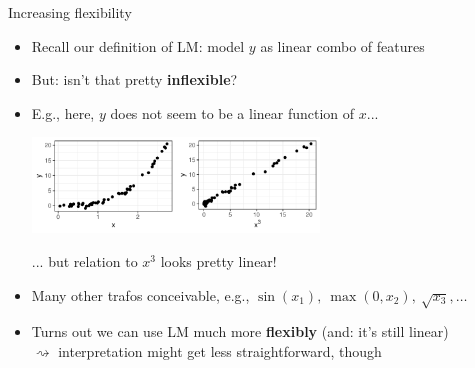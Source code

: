 \documentclass[11pt,compress,t,notes=noshow, xcolor=table]{beamer}
\begin{document}
\begin{vbframe}{Increasing flexibility}

\begin{itemize}
    \item Recall our definition of LM: model $y$ as linear combo of features
    \item But: isn't that pretty \textbf{inflexible}?
    \item E.g., here, $y$ does not seem to be a linear function of $x$...

    \vspace{0.5cm}
    \begin{center}
        \includegraphics[width=0.6\textwidth]{figure/reg_poly_yx3.pdf}
    \end{center}

    ... but relation to $x^3$ looks pretty linear!

    \item Many other trafos conceivable, e.g.,
    $\sin(x_1), ~ \max(0, x_2), ~ \sqrt{x_3}, \dots$
    \item Turns out we can use LM much more
    \textbf{flexibly} (and: it's still linear) \\
    $\rightsquigarrow$ interpretation might get less straightforward, though
\end{itemize}

\end{vbframe}

\end{document}
